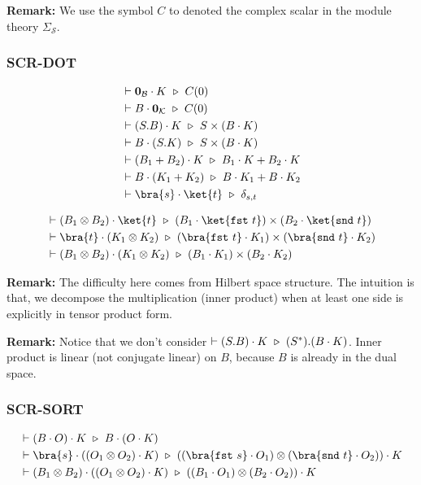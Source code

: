 \textbf{Remark: } We use the symbol $C$ to denoted the complex scalar in the module theory $\Sigma_\mathcal{S}$.



\subsubsection*{\textsf{SCR-DOT}}
\begin{align*}
  & \vdash \mathbf{0}_\mathcal{B} \cdot K \reduce C(0) \\
  & \vdash B \cdot \mathbf{0}_\mathcal{K} \reduce C(0) \\
  & \vdash (S.B) \cdot K \reduce S \times (B \cdot K) \\
  & \vdash B \cdot (S.K) \reduce S \times (B \cdot K) \\
  & \vdash (B_1 + B_2) \cdot K \reduce B_1 \cdot K + B_2 \cdot K \\
  & \vdash B \cdot (K_1 + K_2) \reduce B \cdot K_1 + B \cdot K_2 \\
  & \vdash \bra{s} \cdot \ket{t} \reduce \delta_{s, t} \\
\end{align*}

\begin{align*}
  & \vdash (B_1 \otimes B_2) \cdot \ket{t} \reduce (B_1 \cdot \ket{\fst\ t}) \times (B_2 \cdot \ket{\snd\ t}) \\
  & \vdash \bra{t} \cdot (K_1 \otimes K_2) \reduce (\bra{\fst\ t} \cdot K_1) \times (\bra{\snd\ t} \cdot K_2) \\
  & \vdash (B_1 \otimes B_2) \cdot (K_1 \otimes K_2) \reduce (B_1 \cdot K_1) \times (B_2 \cdot K_2)
\end{align*}

\textbf{Remark: } The difficulty here comes from Hilbert space structure. The intuition is that, we decompose the multiplication (inner product) when at least one side is explicitly in tensor product form.

\textbf{Remark:} Notice that we don't consider $\vdash (S.B) \cdot K \ \triangleright\  (S^*).(B \cdot K)$. Inner product is linear (not conjugate linear) on $B$, because $B$ is already in the dual space.

\subsubsection*{\textsf{SCR-SORT}}
\begin{align*}
  & \vdash (B \cdot O) \cdot K \reduce B \cdot (O \cdot K) \\
  & \vdash \bra{s} \cdot ((O_1 \otimes O_2) \cdot K) \reduce ((\bra{\fst\ s} \cdot O_1) \otimes (\bra{\snd\ t} \cdot O_2)) \cdot K \\
  & \vdash (B_1 \otimes B_2) \cdot ((O_1 \otimes O_2) \cdot K) \reduce ((B_1 \cdot O_1) \otimes (B_2 \cdot O_2)) \cdot K \\
\end{align*}


